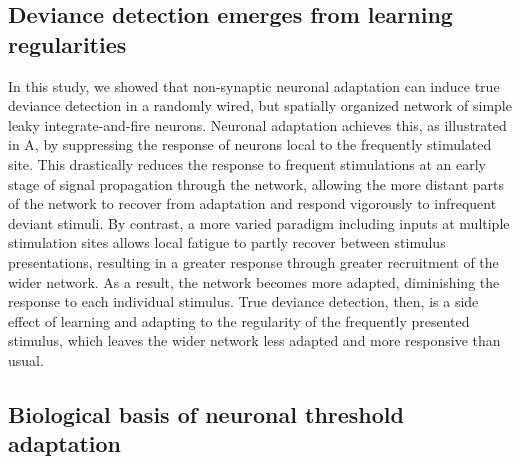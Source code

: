 \documentclass[9pt,lineno,onehalfspacing]{elife}
\begin{document}
\subsection{Deviance detection emerges from learning regularities}

In this study, we showed that non-synaptic neuronal adaptation can induce true deviance detection in a randomly wired, but spatially organized network of simple leaky integrate-and-fire neurons. Neuronal adaptation achieves this, as illustrated in A, by suppressing the response of neurons local to the frequently stimulated site. This drastically reduces the response to frequent stimulations at an early stage of signal propagation through the network, allowing the more distant parts of the network to recover from adaptation and respond vigorously to infrequent deviant stimuli. By contrast, a more varied paradigm including inputs at multiple stimulation sites allows local fatigue to partly recover between stimulus presentations, resulting in a greater response through greater recruitment of the wider network. As a result, the network becomes more adapted, diminishing the response to each individual stimulus. True deviance detection, then, is a side effect of learning and adapting to the regularity of the frequently presented stimulus, which leaves the wider network less adapted and more responsive than usual.

\subsection{Biological basis of neuronal threshold adaptation}
\end{document}
